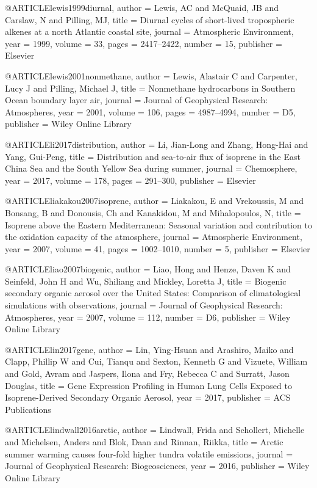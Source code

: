 @ARTICLE{lewis1999diurnal,
  author = {Lewis, AC and McQuaid, JB and Carslaw, N and Pilling, MJ},
  title = {Diurnal cycles of short-lived tropospheric alkenes at a north Atlantic
	coastal site},
  journal = {Atmospheric Environment},
  year = {1999},
  volume = {33},
  pages = {2417--2422},
  number = {15},
  publisher = {Elsevier}
}

@ARTICLE{lewis2001nonmethane,
  author = {Lewis, Alastair C and Carpenter, Lucy J and Pilling, Michael J},
  title = {Nonmethane hydrocarbons in Southern Ocean boundary layer air},
  journal = {Journal of Geophysical Research: Atmospheres},
  year = {2001},
  volume = {106},
  pages = {4987--4994},
  number = {D5},
  publisher = {Wiley Online Library}
}

@ARTICLE{li2017distribution,
  author = {Li, Jian-Long and Zhang, Hong-Hai and Yang, Gui-Peng},
  title = {Distribution and sea-to-air flux of isoprene in the East China Sea
	and the South Yellow Sea during summer},
  journal = {Chemosphere},
  year = {2017},
  volume = {178},
  pages = {291--300},
  publisher = {Elsevier}
}

@ARTICLE{liakakou2007isoprene,
  author = {Liakakou, E and Vrekoussis, M and Bonsang, B and Donousis, Ch and
	Kanakidou, M and Mihalopoulos, N},
  title = {Isoprene above the Eastern Mediterranean: Seasonal variation and
	contribution to the oxidation capacity of the atmosphere},
  journal = {Atmospheric Environment},
  year = {2007},
  volume = {41},
  pages = {1002--1010},
  number = {5},
  publisher = {Elsevier}
}

@ARTICLE{liao2007biogenic,
  author = {Liao, Hong and Henze, Daven K and Seinfeld, John H and Wu, Shiliang
	and Mickley, Loretta J},
  title = {Biogenic secondary organic aerosol over the United States: Comparison
	of climatological simulations with observations},
  journal = {Journal of Geophysical Research: Atmospheres},
  year = {2007},
  volume = {112},
  number = {D6},
  publisher = {Wiley Online Library}
}

@ARTICLE{lin2017gene,
  author = {Lin, Ying-Hsuan and Arashiro, Maiko and Clapp, Phillip W and Cui,
	Tianqu and Sexton, Kenneth G and Vizuete, William and Gold, Avram
	and Jaspers, Ilona and Fry, Rebecca C and Surratt, Jason Douglas},
  title = {Gene Expression Profiling in Human Lung Cells Exposed to Isoprene-Derived
	Secondary Organic Aerosol},
  year = {2017},
  publisher = {ACS Publications}
}

@ARTICLE{lindwall2016arctic,
  author = {Lindwall, Frida and Schollert, Michelle and Michelsen, Anders and
	Blok, Daan and Rinnan, Riikka},
  title = {Arctic summer warming causes four-fold higher tundra volatile emissions},
  journal = {Journal of Geophysical Research: Biogeosciences},
  year = {2016},
  publisher = {Wiley Online Library}
}

